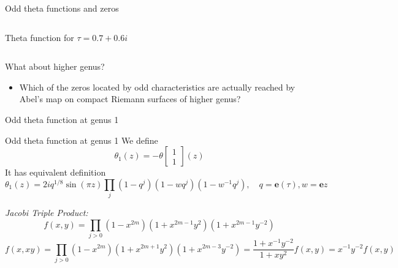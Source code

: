 \documentclass[11pt,aspectratio=169]{beamer}
\newcommand{\ee}[0]{\mathbf{e}}
\begin{document}
\begin{frame}{Odd theta functions and zeros}
\begin{columns}[onlytextwidth]
\begin{column}{0.45\textwidth}
            \tiny Theta function for $\tau = 0.7+0.6i$
            
            \cite{Cha22}
        \end{column}
    \end{columns}

    {
        \begin{block}{What about higher genus?}
            \begin{itemize}
                \item Which of the zeros located by odd characteristics are actually reached by Abel's map on compact Riemann surfaces of higher genus?
            \end{itemize}
        \end{block}
    }
\end{frame}

\begin{frame}{Odd theta function at genus 1}
    \begin{block}{Odd theta function at genus 1}
        We define
        \[\theta_1(z) = -\theta \begin{bmatrix} 1 \\ 1 \end{bmatrix}(z)\]
        It has equivalent definition
        \[\theta_1(z) = 2iq^{1/8} \sin(\pi z) \prod_j (1-q^j) (1-wq^j)(1-w^{-1}q^j) , \quad q=\ee(\tau),w=\ee{z}\]
    \end{block}
    \emph{Jacobi Triple Product:}
    \[f(x,y) = \prod_{j>0} (1-x^{2m})(1+x^{2m-1}y^2)(1+x^{2m-1}y^{-2})\]
    \[f(x,xy) = \prod_{j>0} (1-x^{2m})(1+x^{2m+1}y^2)(1+x^{2m-3}y^{-2}) = \frac{1+x^{-1}y^{-2}}{1+xy^2} f(x,y) = x^{-1}y^{-2}f(x,y)\]
\end{frame}
\end{document}
